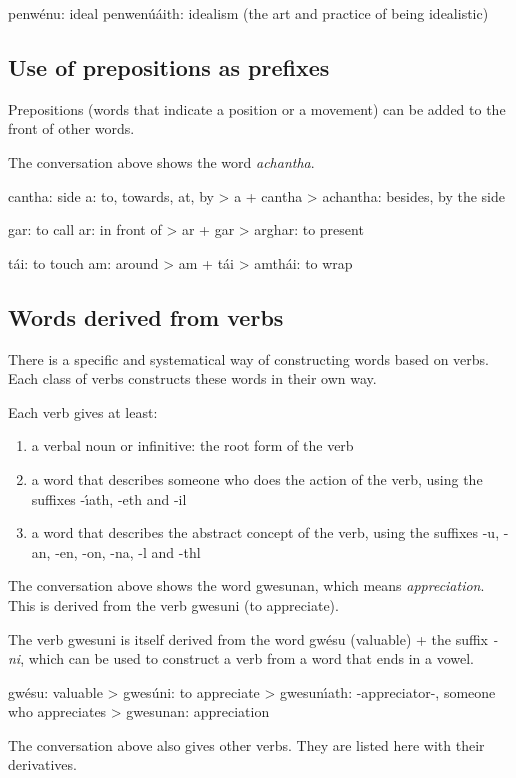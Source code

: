 penw\'{e}nu: ideal
penwen\'{u}\'{a}ith: idealism (the art and practice of being idealistic)

\subsection{Use of prepositions as prefixes}

Prepositions (words that indicate a position or a movement) can be added to the front of other words.

The conversation above shows the word \textit{achantha}.

cantha: side
a: to, towards, at, by
> a + cantha > achantha: besides, by the side

gar: to call
ar: in front of
> ar + gar > arghar: to present

t\'{a}i: to touch
am: around
> am + t\'{a}i > amth\'{a}i: to wrap

\subsection{Words derived from verbs}

There is a specific and systematical way of constructing words based on verbs. Each class of verbs constructs these words in their own way.

Each verb gives at least:
\begin{enumerate}
\item a verbal noun or infinitive: the root form of the verb
\item a word that describes someone who does the action of the verb, using the suffixes -\'{\i}ath, -eth and -il
\item a word that describes the abstract concept of the verb, using the suffixes -u, -an, -en, -on, -na, -l and -thl
\end{enumerate}

The conversation above shows the word gwesunan, which means \textit{appreciation}. This is derived from the verb gwesuni (to appreciate).

The verb gwesuni is itself derived from the word gw\'{e}su (valuable) + the suffix \textit{-ni}, which can be used to construct a verb from a word that ends in a vowel.

gw\'{e}su: valuable
> gwes\'{u}ni: to appreciate
> gwesun\'{\i}ath: -appreciator-, someone who appreciates
> gwesunan: appreciation

The conversation above also gives other verbs. They are listed here with their derivatives.

